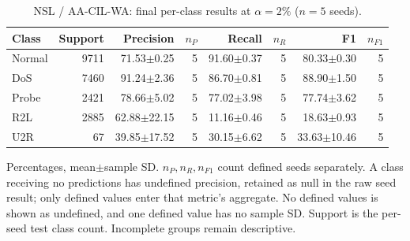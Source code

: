 \begin{table}[t]
\centering\scriptsize
\setlength{\tabcolsep}{3.3pt}
\caption{NSL / AA-CIL-WA: final per-class results at $\alpha=2\%$ ($n=5$ seeds).}\label{tab:forgetting-class-nsl_kdd-aacil-wa}
\begin{tabular}{lrrrrrrr}
\toprule
Class & Support & Precision & $n_P$ & Recall & $n_R$ & F1 & $n_{F1}$ \\
\midrule
Normal & 9711 & 71.53$\pm$0.25 & 5 & 91.60$\pm$0.37 & 5 & 80.33$\pm$0.30 & 5 \\
DoS & 7460 & 91.24$\pm$2.36 & 5 & 86.70$\pm$0.81 & 5 & 88.90$\pm$1.50 & 5 \\
Probe & 2421 & 78.66$\pm$5.02 & 5 & 77.02$\pm$3.98 & 5 & 77.74$\pm$3.62 & 5 \\
R2L & 2885 & 62.88$\pm$22.15 & 5 & 11.16$\pm$0.46 & 5 & 18.63$\pm$0.93 & 5 \\
U2R & 67 & 39.85$\pm$17.52 & 5 & 30.15$\pm$6.62 & 5 & 33.63$\pm$10.46 & 5 \\
\bottomrule
\end{tabular}
\par\smallskip\begin{minipage}{0.98\textwidth}\scriptsize Percentages, mean$\pm$sample SD. $n_P,n_R,n_{F1}$ count defined seeds separately. A class receiving no predictions has undefined precision, retained as null in the raw seed result; only defined values enter that metric's aggregate. No defined values is shown as undefined, and one defined value has no sample SD. Support is the per-seed test class count. Incomplete groups remain descriptive.\end{minipage}
\end{table}

